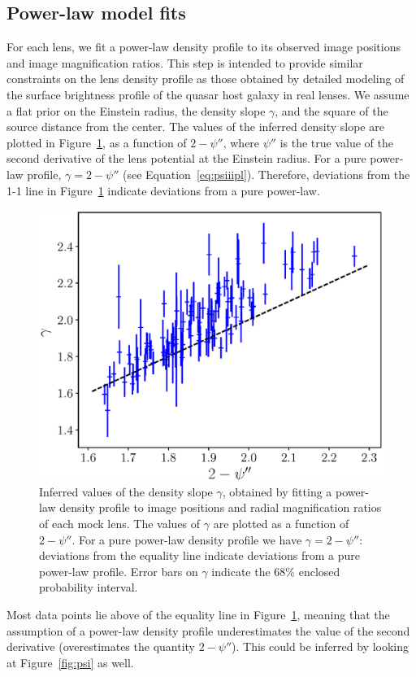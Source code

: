 \documentclass[usenatbib]{mnras}
\def\psiii{\psi''}
\def\Fref#1{Figure~\ref{#1}\xspace}
\def\Eref#1{Equation~\ref{#1}\xspace}
\begin{document}
\subsection{Power-law model fits}

For each lens, we fit a power-law density profile to its observed image positions and image magnification ratios. This step is intended to provide similar constraints on the lens density profile as those obtained by detailed modeling of the surface brightness profile of the quasar host galaxy in real lenses.
We assume a flat prior on the Einstein radius, the density slope $\gamma$, and the square of the source distance from the center.
The values of the inferred density slope are plotted in \Fref{fig:slope}, as a function of $2-\psiii$, where $\psiii$ is the true value of the second derivative of the lens potential at the Einstein radius. For a pure power-law profile, $\gamma = 2-\psiii$ (see \Eref{eq:psiiipl}). Therefore, deviations from the 1-1 line in \Fref{fig:slope} indicate deviations from a pure power-law.
%
\begin{figure}
 \includegraphics[width=\columnwidth]{gamma_fit.eps}
 \caption{
Inferred values of the density slope $\gamma$, obtained by fitting a power-law density profile to image positions and radial magnification ratios of each mock lens. The values of $\gamma$ are plotted as a function of $2-\psiii$. For a pure power-law density profile we have $\gamma = 2-\psiii$: deviations from the equality line indicate deviations from a pure power-law profile.
Error bars on $\gamma$ indicate the 68\% enclosed probability interval.
}
 \label{fig:slope}
\end{figure}
%
Most data points lie above of the equality line in \Fref{fig:slope}, meaning that the assumption of a power-law density profile underestimates the value of the second derivative (overestimates the quantity $2-\psiii$). This could be inferred by looking at \Fref{fig:psi} as well.
\end{document}

